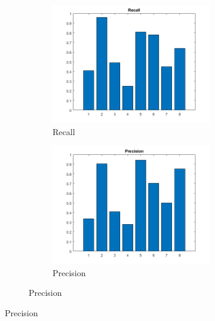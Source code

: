 \begin{figure}[h]
	\centering
	\begin{subfigure}{0.3\textwidth}
		\begin{subfigure}[t]{\textwidth}
			\includegraphics[width=\textwidth]{figures/recall_50C_3NN_2S.png} 
			\caption{Recall}
		\end{subfigure}
		\begin{subfigure}[t]{\textwidth}
			\includegraphics[width=\textwidth]{figures/precision_50C_3NN_2S.png}
			\caption{Precision}
		\end{subfigure}


\end{subfigure}
\end{figure}
